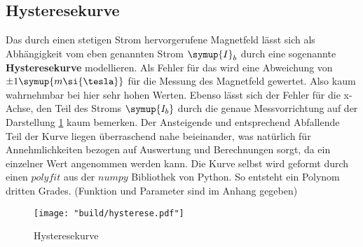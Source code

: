 \subsection{Hysteresekurve}
\label{sec:Hysteresekurve}

 
 Das durch einen stetigen Strom hervorgerufene Magnetfeld lässt sich als Abhängigkeit vom eben genannten Strom $\symup{I}_b$ durch eine sogenannte \textbf{Hysteresekurve} modellieren.
 Als Fehler für das wird eine Abweichung von $\pm 1 \symup{m\si{\tesla}}$ für die Messung des Magnetfeld gewertet. Also kaum wahrnehmbar bei hier sehr hohen Werten. Ebenso lässt sich der Fehler für die x-Achse, den Teil des Stroms 
 $\symup{I_b}$ durch die genaue Messvorrichtung auf der Darstellung \ref{fig:Bfeld} kaum bemerken.
 Der Ansteigende und entsprechend Abfallende Teil der Kurve liegen überraschend nahe beieinander, was natürlich für Annehmlichkeiten bezogen auf Auswertung und Berechnungen sorgt, da ein einzelner Wert angenommen werden kann.
 Die Kurve selbst wird geformt durch einen $polyfit$ aus der $numpy$ Bibliothek von Python. So entsteht ein Polynom dritten Grades. (Funktion und Parameter sind im Anhang gegeben)

\begin{figure}[h]
    \centering
    \texttt{[image: "build/hysterese.pdf"]} %
    \caption{Hysteresekurve}
    \label{fig:Bfeld}
 \end{figure}
